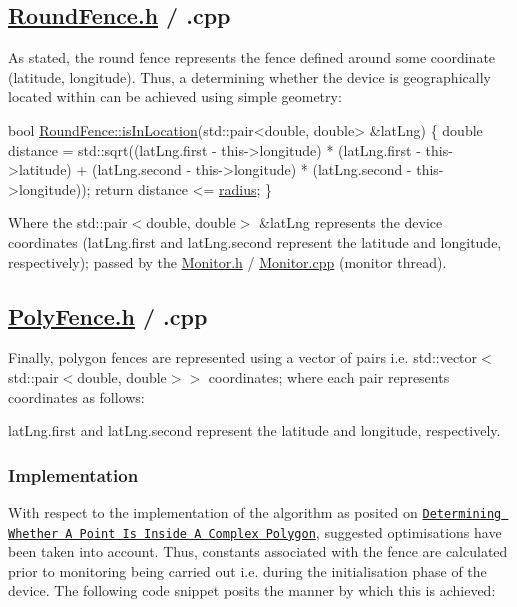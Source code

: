 \subsection*{\hyperlink{_round_fence_8h}{Round\+Fence.\+h} / .cpp}

As stated, the round fence represents the fence defined around some coordinate (latitude, longitude). Thus, a determining whether the device is geographically located within can be achieved using simple geometry\+:


\begin{DoxyCode}
\textcolor{keywordtype}{bool} \hyperlink{class_round_fence_a4955bf0dbd168853ba9913465953865d}{RoundFence::isInLocation}(std::pair<double, double> &latLng)
\{
    \textcolor{keywordtype}{double} distance = std::sqrt((latLng.first - this->longitude) * (latLng.first - this->latitude)
                                + (latLng.second - this->longitude) * (latLng.second - this->longitude));
    \textcolor{keywordflow}{return} distance <= \hyperlink{class_round_fence_a8e9d1a2f22df0bb718522f3ab6cd3b83}{radius};
\}
\end{DoxyCode}
 Where the {\ttfamily std\+::pair$<$double, double$>$ \&lat\+Lng} represents the device coordinates ({\ttfamily lat\+Lng.\+first} and {\ttfamily lat\+Lng.\+second} represent the latitude and longitude, respectively); passed by the \hyperlink{_monitor_8h}{Monitor.\+h} / \hyperlink{_monitor_8cpp}{Monitor.\+cpp} (monitor thread).

\subsection*{\hyperlink{_poly_fence_8h}{Poly\+Fence.\+h} / .cpp}

Finally, polygon fences are represented using a vector of pairs i.\+e. {\ttfamily std\+::vector$<$std\+::pair$<$double, double$>$$>$ coordinates}; where each pair represents coordinates as follows\+:
\begin{DoxyItemize}
\item {\ttfamily lat\+Lng.\+first} and {\ttfamily lat\+Lng.\+second} represent the latitude and longitude, respectively.
\end{DoxyItemize}

\subsubsection*{Implementation}

With respect to the implementation of the algorithm as posited on \href{http://alienryderflex.com/polygon/?fbclid=IwAR1iLUkzQZnRRCWvPyUjvrYXU6W259FduDmq8NhDPSHMaUAtOmUnE_HEoAA}{\tt Determining Whether A Point Is Inside A Complex Polygon}, suggested optimisations have been taken into account. Thus, constants associated with the fence are calculated prior to monitoring being carried out i.\+e. during the initialisation phase of the device. The following code snippet posits the manner by which this is achieved\+:


